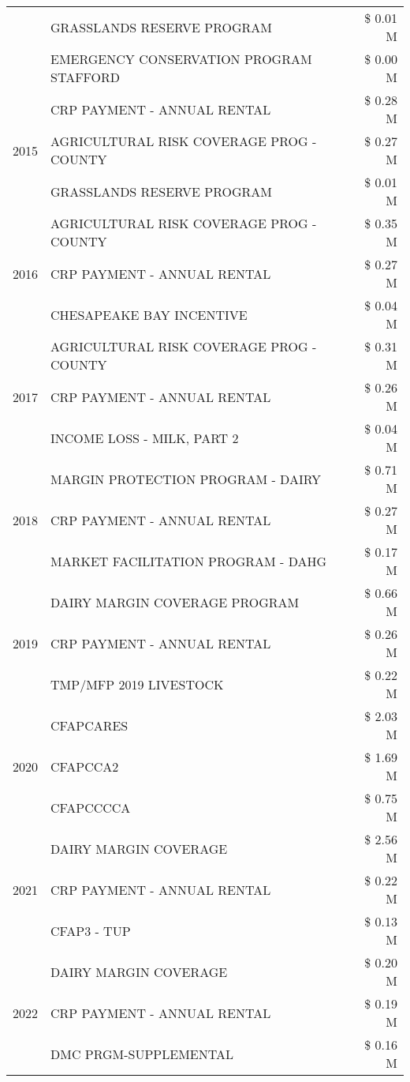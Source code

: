 \begin{tabular}{llr}
 & GRASSLANDS RESERVE PROGRAM & \$ 0.01 M \\
 & EMERGENCY CONSERVATION PROGRAM STAFFORD & \$ 0.00 M \\
\cline{1-3}
\multirow[t]{3}{*}{2015} & CRP PAYMENT - ANNUAL RENTAL & \$ 0.28 M \\
 & AGRICULTURAL RISK COVERAGE PROG - COUNTY & \$ 0.27 M \\
 & GRASSLANDS RESERVE PROGRAM & \$ 0.01 M \\
\cline{1-3}
\multirow[t]{3}{*}{2016} & AGRICULTURAL RISK COVERAGE PROG - COUNTY & \$ 0.35 M \\
 & CRP PAYMENT - ANNUAL RENTAL & \$ 0.27 M \\
 & CHESAPEAKE BAY INCENTIVE & \$ 0.04 M \\
\cline{1-3}
\multirow[t]{3}{*}{2017} & AGRICULTURAL RISK COVERAGE PROG - COUNTY & \$ 0.31 M \\
 & CRP PAYMENT - ANNUAL RENTAL & \$ 0.26 M \\
 & INCOME LOSS - MILK, PART 2 & \$ 0.04 M \\
\cline{1-3}
\multirow[t]{3}{*}{2018} & MARGIN PROTECTION PROGRAM - DAIRY & \$ 0.71 M \\
 & CRP PAYMENT - ANNUAL RENTAL & \$ 0.27 M \\
 & MARKET FACILITATION PROGRAM - DAHG & \$ 0.17 M \\
\cline{1-3}
\multirow[t]{3}{*}{2019} & DAIRY MARGIN COVERAGE PROGRAM & \$ 0.66 M \\
 & CRP PAYMENT - ANNUAL RENTAL & \$ 0.26 M \\
 & TMP/MFP 2019 LIVESTOCK & \$ 0.22 M \\
\cline{1-3}
\multirow[t]{3}{*}{2020} & CFAPCARES & \$ 2.03 M \\
 & CFAPCCA2 & \$ 1.69 M \\
 & CFAPCCCCA & \$ 0.75 M \\
\cline{1-3}
\multirow[t]{3}{*}{2021} & DAIRY MARGIN COVERAGE & \$ 2.56 M \\
 & CRP PAYMENT - ANNUAL RENTAL & \$ 0.22 M \\
 & CFAP3 - TUP & \$ 0.13 M \\
\cline{1-3}
\multirow[t]{3}{*}{2022} & DAIRY MARGIN COVERAGE & \$ 0.20 M \\
 & CRP PAYMENT - ANNUAL RENTAL & \$ 0.19 M \\
 & DMC PRGM-SUPPLEMENTAL & \$ 0.16 M \\
\cline{1-3}
\bottomrule
\end{tabular}
